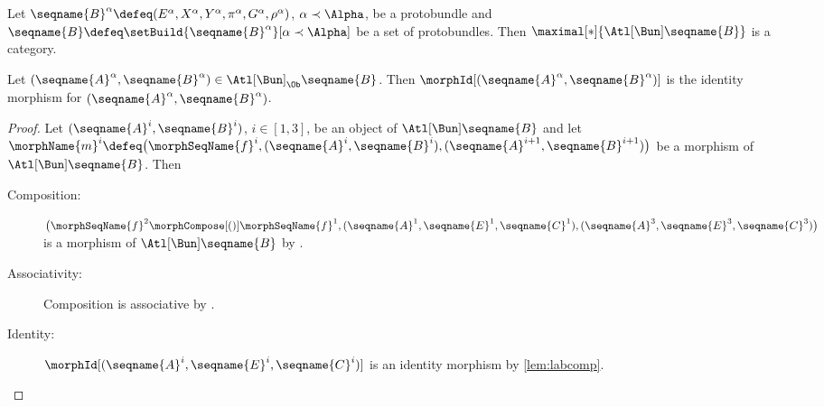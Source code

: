 \documentclass{article}
\begin{document}
\begin{lemma}
\label{lem:BunATLiscat}
Let
$
  \seqname{B}^\alpha \defeq
  (E^\alpha, X^\alpha, Y^\alpha, \pi^\alpha, G^\alpha, \rho^\alpha)
$,
$\alpha \prec \Alpha$, be a protobundle and
$\seqname{B} \defeq \setBuild{{\seqname{B}^\alpha}}[\alpha \prec \Alpha]$
be a set of protobundles.
Then $\maximal[*]{\Atl[\Bun] \seqname{B}}$ is a category.

Let
$
  (\seqname{A}^\alpha, \seqname{B}^\alpha)
  \in
  \Atl[\Bun]_\Ob \seqname{B}
$.
Then $\morphId[{{(\seqname{A}^\alpha, \seqname{B}^\alpha)}}]$ is the
identity morphism for $(\seqname{A}^\alpha, \seqname{B}^\alpha)$.

\begin{proof}
Let $(\seqname{A}^i,\seqname{B}^i)$, $i \in [1,3]$,
be an object of $\Atl[\Bun] \seqname{B}$ and
let \\
$
  \morphName{m}^i \defeq
  \bigl (
    \morphSeqName{f}^i,
    (\seqname{A}^i,\seqname{B}^i),
    (\seqname{A}^{i+1},\seqname{B}^{i+1})
  \bigr )
$
be a morphism of $\Atl[\Bun] \seqname{B}$. Then
\begin{description}
\item[Composition:]
$
  \bigl (
    \morphSeqName{f}^2 \morphCompose[()] \morphSeqName{f}^1,
    (\seqname{A}^1,\seqname{E}^1,\seqname{C}^1),
    (\seqname{A}^3,\seqname{E}^3,\seqname{C}^3)
  \bigr )
$
is a morphism of $\Atl[\Bun] \seqname{B}$ by
.

\item[Associativity:]
Composition is associative by .

\item[Identity:]
$\morphId[(\seqname{A}^i, \seqname{E}^i, \seqname{C}^i)]$ is an identity
morphism by \cref{lem:labcomp}.
\end{description}
\end{proof}
\end{lemma}
\end{document}
